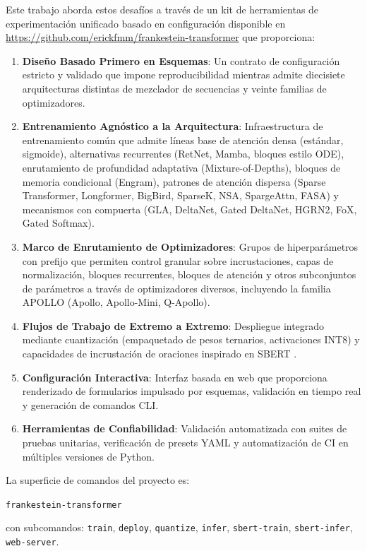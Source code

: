 \documentclass[11pt,a4paper]{article}
\begin{document}
Este trabajo aborda estos desafíos a través de un kit de herramientas de experimentación unificado basado en configuración disponible en \url{https://github.com/erickfmm/frankestein-transformer} que proporciona:
\begin{enumerate}[leftmargin=*]
    \item \textbf{Diseño Basado Primero en Esquemas}: Un contrato de configuración estricto y validado que impone reproducibilidad mientras admite diecisiete arquitecturas distintas de mezclador de secuencias y veinte familias de optimizadores.
    \item \textbf{Entrenamiento Agnóstico a la Arquitectura}: Infraestructura de entrenamiento común que admite líneas base de atención densa (estándar, sigmoide), alternativas recurrentes (RetNet, Mamba, bloques estilo ODE), enrutamiento de profundidad adaptativa (Mixture-of-Depths), bloques de memoria condicional (Engram), patrones de atención dispersa (Sparse Transformer, Longformer, BigBird, SparseK, NSA, SpargeAttn, FASA) y mecanismos con compuerta (GLA, DeltaNet, Gated DeltaNet, HGRN2, FoX, Gated Softmax).
    \item \textbf{Marco de Enrutamiento de Optimizadores}: Grupos de hiperparámetros con prefijo que permiten control granular sobre incrustaciones, capas de normalización, bloques recurrentes, bloques de atención y otros subconjuntos de parámetros a través de optimizadores diversos, incluyendo la familia APOLLO (Apollo, Apollo-Mini, Q-Apollo).
    \item \textbf{Flujos de Trabajo de Extremo a Extremo}: Despliegue integrado mediante cuantización (empaquetado de pesos ternarios, activaciones INT8) y capacidades de incrustación de oraciones inspirado en SBERT \citep{reimers_sentence-bert_2019}.
    \item \textbf{Configuración Interactiva}: Interfaz basada en web que proporciona renderizado de formularios impulsado por esquemas, validación en tiempo real y generación de comandos CLI.
    \item \textbf{Herramientas de Confiabilidad}: Validación automatizada con suites de pruebas unitarias, verificación de presets YAML y automatización de CI en múltiples versiones de Python.
\end{enumerate}

La superficie de comandos del proyecto es:
\begin{center}
\texttt{frankestein-transformer}
\end{center}
con subcomandos:
\texttt{train}, \texttt{deploy}, \texttt{quantize}, \texttt{infer}, \texttt{sbert-train}, \texttt{sbert-infer}, \texttt{web-server}.
\end{document}
